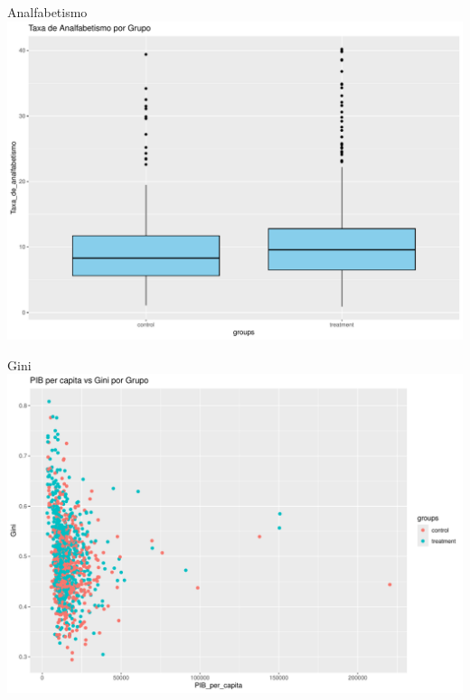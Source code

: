 \documentclass[
  ignorenonframetext,
]{beamer}
\begin{document}
\begin{frame}{Analfabetismo}
\label{analfabetismo-1}
\includegraphics{graficos_files/figure-beamer/unnamed-chunk-10-1.pdf}
\end{frame}

\begin{frame}{Gini}
\label{gini}
\includegraphics{graficos_files/figure-beamer/unnamed-chunk-11-1.pdf}
\end{frame}
\end{document}

